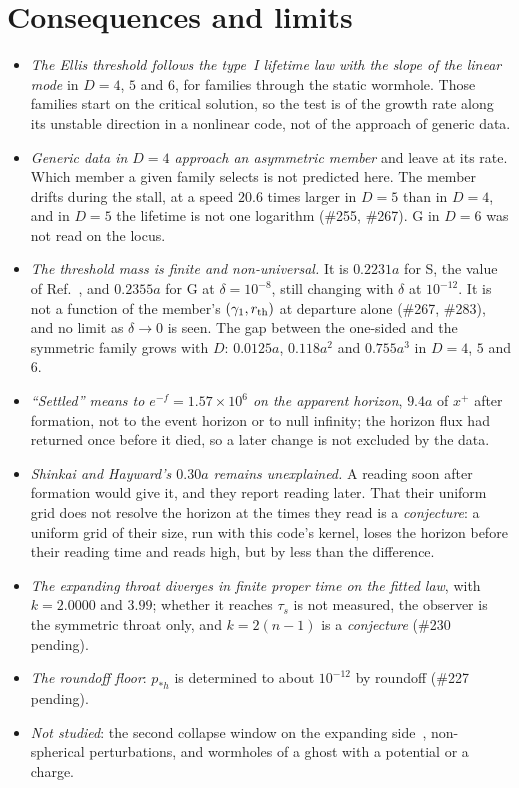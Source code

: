 \documentclass[11pt]{article}
\newcommand{\pst}{p_{*h}}
\begin{document}
\section{Consequences and limits}\label{sec:limits}

\begin{itemize}
\item \emph{The Ellis threshold follows the type~I lifetime law with the slope of the linear mode} in $D=4$, $5$ and $6$,
for families through the static wormhole. Those families start on the critical solution, so the test is of the
growth rate along its unstable direction in a nonlinear code, not of the approach of generic data.
\item \emph{Generic data in $D=4$ approach an asymmetric member} and leave at its rate. Which member a given family selects
is not predicted here. The member drifts during the stall, at a speed $20.6$ times larger in $D=5$ than in $D=4$,
and in $D=5$ the lifetime is not one logarithm (\#255, \#267). G in $D=6$ was not read on the locus.
\item \emph{The threshold mass is finite and non-universal.} It is $0.2231a$ for S, the value of Ref.~\cite{GGS2009b},
and $0.2355a$ for G at $\delta=10^{-8}$, still changing with $\delta$ at $10^{-12}$. It is not a function of the
member's $(\gamma_1,r_{\rm th})$ at departure alone (\#267, \#283), and no limit as $\delta\to0$ is seen. The gap between the one-sided and the symmetric family grows with $D$:
$0.0125a$, $0.118a^{2}$ and $0.755a^{3}$ in $D=4$, $5$ and $6$.
\item \emph{``Settled'' means to $e^{-f}=1.57\times10^6$ on the apparent horizon}, $9.4a$ of $x^+$ after formation, not
to the event horizon or to null infinity; the horizon flux had returned once before it died, so a later change is not
excluded by the data.
\item \emph{Shinkai and Hayward's $0.30a$ remains unexplained.} A reading soon after formation would give it, and they
report reading later. That their uniform grid does not resolve the horizon at the times they read is a
\emph{conjecture}: a uniform grid of their size, run with this code's kernel, loses the horizon before their reading
time and reads high, but by less than the difference.
\item \emph{The expanding throat diverges in finite proper time on the fitted law}, with $k=2.0000$ and $3.99$; whether
it reaches $\tau_s$ is not measured, the observer is the symmetric throat only, and $k=2(n-1)$ is a \emph{conjecture}
(\#230 pending).
\item \emph{The roundoff floor}: $\pst$ is determined to about $10^{-12}$ by roundoff (\#227 pending).
\item \emph{Not studied}: the second collapse window on the expanding side~\cite{GGS2009b}, non-spherical
perturbations, and wormholes of a ghost with a potential or a charge.
\end{itemize}
\end{document}
